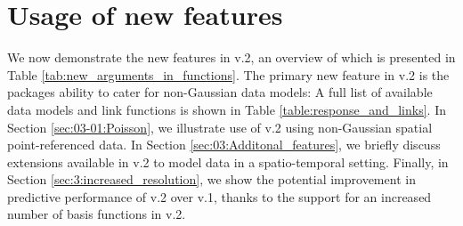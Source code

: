 \documentclass[nojss]{jss}
\begin{document}
\section{Usage of new features}\label{SEC:IllustrativeExample}

We now demonstrate the new features in  v.2, an overview of which is presented in Table \ref{tab:new_arguments_in_functions}. 
 The primary new feature in  v.2 is the packages ability to cater for non-Gaussian data models: A full list of available data models and link functions is shown in Table \ref{table:response_and_links}. 
 In Section \ref{sec:03-01:Poisson}, we illustrate use of  v.2 using non-Gaussian spatial point-referenced data. %
 In Section \ref{sec:03:Additonal_features}, we briefly discuss extensions available in  v.2 to model data in a spatio-temporal setting. 
 Finally, in Section \ref{sec:3:increased_resolution}, we show the potential improvement in predictive performance of  v.2 over  v.1, thanks to the support for an increased number of basis functions in  v.2.
% 
\end{document}
